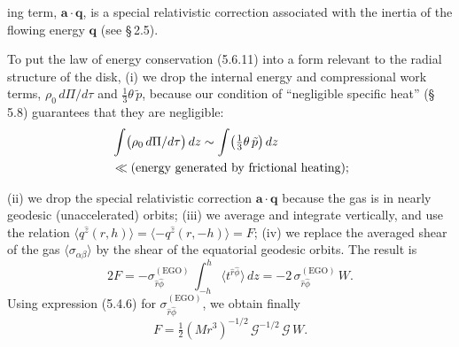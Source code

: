 

\noindent
ing term, $\mathbf{a} \cdot \mathbf{q}$, is a special relativistic correction associated with the inertia of
the flowing energy $\mathbf{q}$ (see \S\,2.5).

To put the law of energy conservation (5.6.11) into a form relevant to the
radial structure of the disk, (i) we drop the internal energy and compressional
work terms, $\rho_0\, d\Pi/d\tau$ and $\tfrac{1}{3}\theta\, \tilde{p}$, because our condition of ``negligible specific
heat'' (\S\,5.8) guarantees that they are negligible:
%
\begin{align}
&\int \bigl(\rho_0\, d\Pi/d\tau\bigr)\, dz
  \sim \int \bigl(\tfrac{1}{3}\theta\, \tilde{p}\bigr)\, dz \notag\\
&\ll (\text{energy generated by frictional heating}); \notag
\end{align}

(ii) we drop the special relativistic correction $\mathbf{a}\cdot\mathbf{q}$ because the gas is in nearly
geodesic (unaccelerated) orbits; (iii) we average and integrate vertically, and use
the relation $\langle q^{\hat{z}}(r,h)\rangle = \langle -q^{\hat{z}}(r,-h)\rangle = F$;
(iv) we replace the averaged shear of
the gas $\langle\sigma_{\alpha\beta}\rangle$ by the shear of the equatorial geodesic orbits.  The result is
%
\begin{equation}
2F = -\sigma_{\hat{r}\hat{\phi}}^{(\mathrm{EGO})}\,
  \int_{-h}^{h} \langle t^{\hat{r}\hat{\phi}} \rangle\, dz
  = -2\,\sigma_{\hat{r}\hat{\phi}}^{(\mathrm{EGO})}\, W.
\end{equation}
%
Using expression (5.4.6) for $\sigma_{\hat{r}\hat{\phi}}^{(\mathrm{EGO})}$,
we obtain finally
%
\begin{equation}
\tag{5.6.12}
F = \tfrac{1}{2}(Mr^3)^{-1/2}\,\mathscr{G}^{-1/2}\,\mathscr{G}\,W.
\end{equation}

